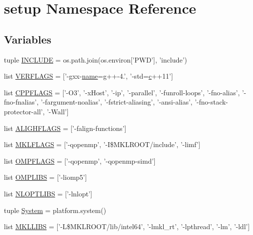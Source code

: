 \hypertarget{namespacesetup}{\section{setup Namespace Reference}
\label{namespacesetup}
}
\subsection*{Variables}
\begin{DoxyCompactItemize}
\item 
tuple \hyperlink{namespacesetup_acf0d303c559d8ca52f78fb7970b2de4d}{I\-N\-C\-L\-U\-D\-E} = os.\-path.\-join(os.\-environ\mbox{[}'P\-W\-D'\mbox{]}, 'include')
\item 
list \hyperlink{namespacesetup_a4b1725ffabf7e972e9416fc047daa758}{V\-E\-R\-F\-L\-A\-G\-S} = \mbox{[}'-\/gxx-\/\hyperlink{namespacesetup_a61de3710bf6c9d78c0afa352263f8b09}{name}=g++-\/4.', '-\/std=\hyperlink{_constants_8cpp_a2c09e929a6ea340fc9653cca414b11d3}{c}++11'\mbox{]}
\item 
list \hyperlink{namespacesetup_a94afbb2834cc36eb3a362aec00c4f0bb}{C\-P\-P\-F\-L\-A\-G\-S} = \mbox{[}'-\/O3', '-\/x\-Host', '-\/ip', '-\/parallel', '-\/funroll-\/loops', '-\/fno-\/alias', '-\/fno-\/fnalias', '-\/fargument-\/noalias', '-\/fstrict-\/aliasing', '-\/ansi-\/alias', '-\/fno-\/stack-\/protector-\/all', '-\/Wall'\mbox{]}
\item 
list \hyperlink{namespacesetup_ad6de2d2793e8dad016a00e201563ff15}{A\-L\-I\-G\-H\-F\-L\-A\-G\-S} = \mbox{[}'-\/falign-\/functions'\mbox{]}
\item 
list \hyperlink{namespacesetup_a356d52830aa81f3e0cfda1095f3162f8}{M\-K\-L\-F\-L\-A\-G\-S} = \mbox{[}'-\/qopenmp', '-\/I\$\-M\-K\-L\-R\-O\-O\-T/include', '-\/limf'\mbox{]}
\item 
list \hyperlink{namespacesetup_aa0d1a93d0a5a5a10a02c0cac8dbcaa02}{O\-M\-P\-F\-L\-A\-G\-S} = \mbox{[}'-\/qopenmp', '-\/qopenmp-\/simd'\mbox{]}
\item 
list \hyperlink{namespacesetup_aad0176b2380288a025c0c71db934ee2d}{O\-M\-P\-L\-I\-B\-S} = \mbox{[}'-\/liomp5'\mbox{]}
\item 
list \hyperlink{namespacesetup_ae8e55c011b0f75d872a51166b37395ae}{N\-L\-O\-P\-T\-L\-I\-B\-S} = \mbox{[}'-\/lnlopt'\mbox{]}
\item 
tuple \hyperlink{namespacesetup_a09d66ddf3e3c0276fcc930fa2ec73ab2}{System} = platform.\-system()
\item 
list \hyperlink{namespacesetup_a3ecd92f8e1e53dd6528359a08aee59e9}{M\-K\-L\-L\-I\-B\-S} = \mbox{[}'-\/L\$\-M\-K\-L\-R\-O\-O\-T/lib/intel64', '-\/lmkl\-\_\-rt', '-\/lpthread', '-\/lm', '-\/ldl'\mbox{]}

\end{DoxyCompactItemize}
